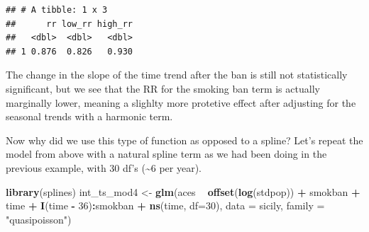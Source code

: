 \documentclass[
]{book}
\newenvironment{Shaded}{\begin{snugshade}}{\end{snugshade}}
\newcommand{\DataTypeTok}[1]{\textcolor[rgb]{0.13,0.29,0.53}{#1}}
\newcommand{\DecValTok}[1]{\textcolor[rgb]{0.00,0.00,0.81}{#1}}
\newcommand{\KeywordTok}[1]{\textcolor[rgb]{0.13,0.29,0.53}{\textbf{#1}}}
\newcommand{\NormalTok}[1]{#1}
\newcommand{\OperatorTok}[1]{\textcolor[rgb]{0.81,0.36,0.00}{\textbf{#1}}}
\newcommand{\StringTok}[1]{\textcolor[rgb]{0.31,0.60,0.02}{#1}}
\begin{document}
\begin{verbatim}
## # A tibble: 1 x 3
##      rr low_rr high_rr
##   <dbl>  <dbl>   <dbl>
## 1 0.876  0.826   0.930
\end{verbatim}

The change in the slope of the time trend after the ban is still not statistically significant, but we see that the RR for the smoking ban term is actually marginally lower, meaning a slighlty more protetive effect after adjusting for the seasonal trends with a harmonic term.

Now why did we use this type of function as opposed to a spline? Let's repeat the model from above with a natural spline term as we had been doing in the previous example, with 30 df's (\textasciitilde6 per year).

\begin{Shaded}
\begin{Highlighting}[]
\KeywordTok{library}\NormalTok{(splines)}
\NormalTok{int_ts_mod4 <-}\StringTok{ }\KeywordTok{glm}\NormalTok{(aces }\OperatorTok{~}\StringTok{ }\KeywordTok{offset}\NormalTok{(}\KeywordTok{log}\NormalTok{(stdpop)) }\OperatorTok{+}\StringTok{ }\NormalTok{smokban }\OperatorTok{+}\StringTok{ }\NormalTok{time }\OperatorTok{+}\StringTok{ }
\StringTok{                     }\KeywordTok{I}\NormalTok{(time }\OperatorTok{-}\StringTok{ }\DecValTok{36}\NormalTok{)}\OperatorTok{:}\NormalTok{smokban }\OperatorTok{+}\StringTok{ }\KeywordTok{ns}\NormalTok{(time, }\DataTypeTok{df=}\DecValTok{30}\NormalTok{), }
                      \DataTypeTok{data =}\NormalTok{ sicily, }
                      \DataTypeTok{family =} \StringTok{"quasipoisson"}\NormalTok{)}
\end{Highlighting}
\end{Shaded}
\end{document}
